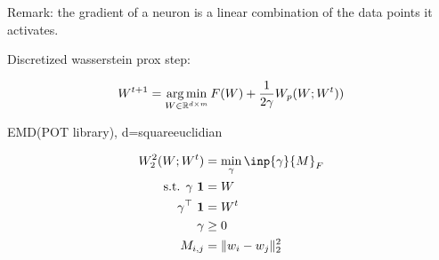 Remark: the gradient of a neuron is a linear combination of the data points it activates.

Discretized wasserstein prox step:

\begin{equation}
	W^{t+1} = \operatorname*{arg\,min}_{W \in \mathbb{R}^{d \times m}} F(W) + \frac{1}{2 \gamma} W_p(W; W^t))
\end{equation}


EMD(POT library), d=squareeuclidian

\begin{align}
	W_2^2(W; W^t) &= \min_{\gamma} \inp{\gamma}{M}_F \\
	\text{s.t.  } \gamma ~ \mathbf{1} &= W \\
	\gamma^\top ~ \mathbf{1} &= W^t \\
	\gamma &\geq 0 \\
	M_{i, j} &= \lVert w_i - w_j \rVert^2_2
\end{align}

